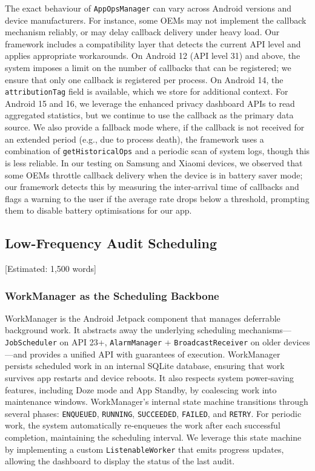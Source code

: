 The exact behaviour of \texttt{AppOpsManager} can vary across Android versions and device manufacturers. For instance, some OEMs may not implement the callback mechanism reliably, or may delay callback delivery under heavy load. Our framework includes a compatibility layer that detects the current API level and applies appropriate workarounds. On Android 12 (API level 31) and above, the system imposes a limit on the number of callbacks that can be registered; we ensure that only one callback is registered per process. On Android 14, the \texttt{attributionTag} field is available, which we store for additional context. For Android 15 and 16, we leverage the enhanced privacy dashboard APIs to read aggregated statistics, but we continue to use the callback as the primary data source. We also provide a fallback mode where, if the callback is not received for an extended period (e.g., due to process death), the framework uses a combination of \texttt{getHistoricalOps} and a periodic scan of system logs, though this is less reliable. In our testing on Samsung and Xiaomi devices, we observed that some OEMs throttle callback delivery when the device is in battery saver mode; our framework detects this by measuring the inter-arrival time of callbacks and flags a warning to the user if the average rate drops below a threshold, prompting them to disable battery optimisations for our app.

\subsection{Low-Frequency Audit Scheduling} [Estimated: 1,500 words]

\subsubsection{WorkManager as the Scheduling Backbone}

WorkManager is the Android Jetpack component that manages deferrable background work. It abstracts away the underlying scheduling mechanisms—\texttt{JobScheduler} on API 23+, \texttt{AlarmManager} + \texttt{BroadcastReceiver} on older devices—and provides a unified API with guarantees of execution. WorkManager persists scheduled work in an internal SQLite database, ensuring that work survives app restarts and device reboots. It also respects system power-saving features, including Doze mode and App Standby, by coalescing work into maintenance windows. WorkManager's internal state machine transitions through several phases: \texttt{ENQUEUED}, \texttt{RUNNING}, \texttt{SUCCEEDED}, \texttt{FAILED}, and \texttt{RETRY}. For periodic work, the system automatically re-enqueues the work after each successful completion, maintaining the scheduling interval. We leverage this state machine by implementing a custom \texttt{ListenableWorker} that emits progress updates, allowing the dashboard to display the status of the last audit.

